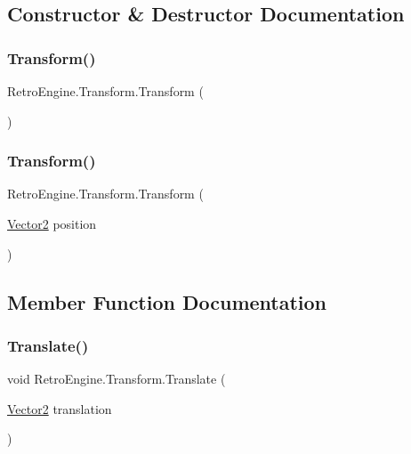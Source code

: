 \subsection{Constructor \& Destructor Documentation}
\mbox{\label{class_retro_engine_1_1_transform_a8ed9211c1a5c4210c99bc8cc9df46b16}} 
\subsubsection{\texorpdfstring{Transform()}{Transform()}\hspace{0.1cm}{\footnotesize\ttfamily [1/2]}}
{\footnotesize\ttfamily Retro\+Engine.\+Transform.\+Transform (\begin{DoxyParamCaption}{ }\end{DoxyParamCaption})}

\mbox{\label{class_retro_engine_1_1_transform_ac290a3caf18a57bf5504c00470a1dbab}} 
\subsubsection{\texorpdfstring{Transform()}{Transform()}\hspace{0.1cm}{\footnotesize\ttfamily [2/2]}}
{\footnotesize\ttfamily Retro\+Engine.\+Transform.\+Transform (\begin{DoxyParamCaption}\item[{\mbox{\hyperlink{struct_retro_engine_1_1_vector2}{Vector2}}}]{position }\end{DoxyParamCaption})}



\subsection{Member Function Documentation}
\mbox{\label{class_retro_engine_1_1_transform_ad608f74227fbc6618cbc4395d3642f88}} 
\subsubsection{\texorpdfstring{Translate()}{Translate()}}
{\footnotesize\ttfamily void Retro\+Engine.\+Transform.\+Translate (\begin{DoxyParamCaption}\item[{\mbox{\hyperlink{struct_retro_engine_1_1_vector2}{Vector2}}}]{translation }\end{DoxyParamCaption})}



